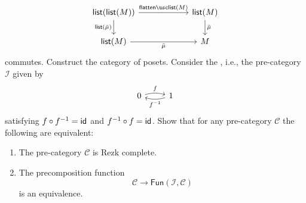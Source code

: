 \begin{exercises}
\begin{equation*}
    \begin{tikzcd}[column sep=6em]
      \lst(\lst(M)) \arrow[r,"\flattenlist(M)"] \arrow[d,swap,"\lst(\bar{\mu})"] & \lst(M) \arrow[d,"\bar{\mu}"] \\
      \lst(M) \arrow[r,swap,"\bar{\mu}"] & M
    \end{tikzcd}
  \end{equation*}
  commutes. 
  \exercise Construct the category of posets.
  \exercise Consider the , i.e., the pre-category $\mathcal{I}$ given by
  \begin{equation*}
    \begin{tikzcd}
      0 \arrow[r,bend left=15,"f"] & 1 \arrow[l,bend left=15,"{f^{-1}}"]
    \end{tikzcd}
  \end{equation*}
  satisfying $f\circ f^{-1}=\mathsf{id}_{}$ and $f^{-1}\circ f=\mathsf{id}_{}$. Show that for any pre-category $\mathcal{C}$ the following are equivalent:
  \begin{enumerate}
  \item The pre-category $\mathcal{C}$ is Rezk complete.
  \item The precomposition function
    \begin{equation*}
      \mathcal{C}\to\mathsf{Fun}(\mathcal{I},\mathcal{C})
    \end{equation*}
    is an equivalence.
  \end{enumerate}
\end{exercises}
